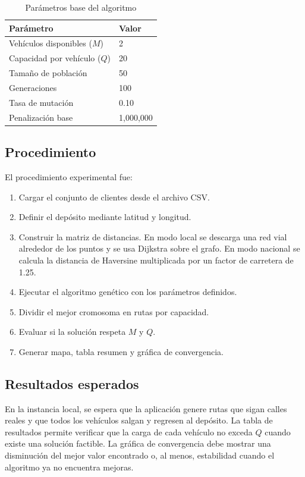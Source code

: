 \documentclass[runningheads]{llncs}
\begin{document}
\begin{table}
\centering
\caption{Parámetros base del algoritmo}
\begin{tabular}{ll}
\toprule
Parámetro & Valor \\
\midrule
Vehículos disponibles ($M$) & 2 \\
Capacidad por vehículo ($Q$) & 20 \\
Tamaño de población & 50 \\
Generaciones & 100 \\
Tasa de mutación & 0.10 \\
Penalización base & 1,000,000 \\
\bottomrule
\end{tabular}
\end{table}

\subsection{Procedimiento}

El procedimiento experimental fue:

\begin{enumerate}
    \item Cargar el conjunto de clientes desde el archivo CSV.
    \item Definir el depósito mediante latitud y longitud.
    \item Construir la matriz de distancias. En modo local se descarga una red vial alrededor de los puntos y se usa Dijkstra sobre el grafo. En modo nacional se calcula la distancia de Haversine multiplicada por un factor de carretera de 1.25.
    \item Ejecutar el algoritmo genético con los parámetros definidos.
    \item Dividir el mejor cromosoma en rutas por capacidad.
    \item Evaluar si la solución respeta $M$ y $Q$.
    \item Generar mapa, tabla resumen y gráfica de convergencia.
\end{enumerate}

\subsection{Resultados esperados}

En la instancia local, se espera que la aplicación genere rutas que sigan calles reales y que todos los vehículos salgan y regresen al depósito. La tabla de resultados permite verificar que la carga de cada vehículo no exceda $Q$ cuando existe una solución factible. La gráfica de convergencia debe mostrar una disminución del mejor valor encontrado o, al menos, estabilidad cuando el algoritmo ya no encuentra mejoras.
\end{document}
